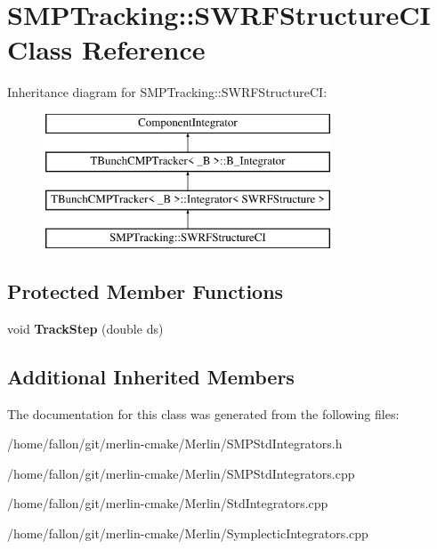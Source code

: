 \hypertarget{classSMPTracking_1_1SWRFStructureCI}{}\section{S\+M\+P\+Tracking\+:\+:S\+W\+R\+F\+Structure\+CI Class Reference}
\label{classSMPTracking_1_1SWRFStructureCI}
Inheritance diagram for S\+M\+P\+Tracking\+:\+:S\+W\+R\+F\+Structure\+CI\+:\begin{figure}[H]
\begin{center}
\leavevmode
\includegraphics[height=4.000000cm]{classSMPTracking_1_1SWRFStructureCI}
\end{center}
\end{figure}
\subsection*{Protected Member Functions}
\begin{DoxyCompactItemize}
\item 
\mbox{\label{classSMPTracking_1_1SWRFStructureCI_abacd25c38dc156e48291c3cd896861b7}} 
void {\bfseries Track\+Step} (double ds)
\end{DoxyCompactItemize}
\subsection*{Additional Inherited Members}


The documentation for this class was generated from the following files\+:\begin{DoxyCompactItemize}
\item 
/home/fallon/git/merlin-\/cmake/\+Merlin/S\+M\+P\+Std\+Integrators.\+h\item 
/home/fallon/git/merlin-\/cmake/\+Merlin/S\+M\+P\+Std\+Integrators.\+cpp\item 
/home/fallon/git/merlin-\/cmake/\+Merlin/Std\+Integrators.\+cpp\item 
/home/fallon/git/merlin-\/cmake/\+Merlin/Symplectic\+Integrators.\+cpp\end{DoxyCompactItemize}
